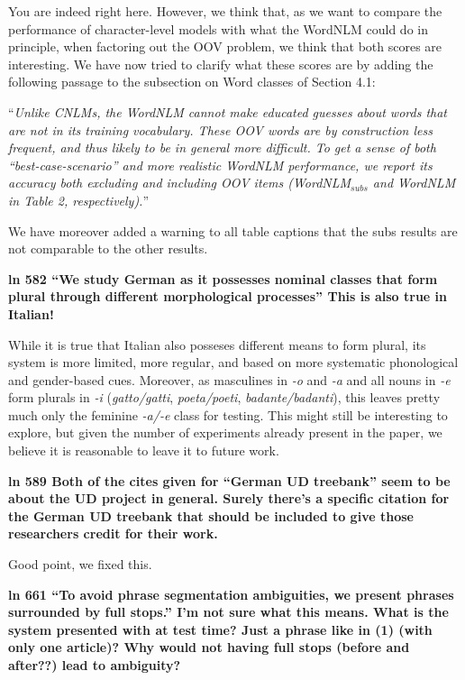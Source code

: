 \documentclass{article}[11pt,a4paper,oneside]
\begin{document}
You are indeed right here. However, we think that, as we want to compare the performance of character-level models with what the WordNLM could do in principle, when factoring out the OOV problem, we think that both scores are interesting. We have now tried to clarify what these scores are by adding the following passage to the subsection on Word classes of Section 4.1:

``\textit{Unlike CNLMs, the WordNLM cannot make educated guesses about words that are not in its training vocabulary. These OOV words are by construction less frequent, and thus likely to be in general more difficult. To get a sense of both ``best-case-scenario'' and more realistic WordNLM performance, we report its accuracy both excluding and including OOV items (WordNLM$_{subs}$ and WordNLM in Table 2, respectively).}''

We have moreover added a warning to all table captions that the subs results are not comparable to the other results.
\newline

\textbf{ln 582 ``We study German as it possesses nominal classes that form plural through different morphological processes'' This is also true in Italian!}

While it is true that Italian also posseses different means to form plural, its system is more limited, more regular, and based on more systematic phonological and gender-based cues. Moreover, as masculines in \textit{-o} and \textit{-a} and all nouns in \textit{-e} form plurals in \textit{-i}  (\textit{gatto/gatti}, \textit{poeta/poeti}, \textit{badante/badanti}), this leaves pretty much only the feminine \textit{-a/-e} class for testing. This might still be interesting to explore, but given the number of experiments already present in the paper, we believe it is reasonable to leave it to future work.
\newline

\textbf{ln 589 Both of the cites given for ``German UD treebank'' seem to be about the UD project in general. Surely there's a specific citation for the German UD treebank that should be included to give those researchers credit for their work.}

Good point, we fixed this.
\newline

\textbf{ln 661 ``To avoid phrase segmentation ambiguities, we present phrases surrounded by full stops.'' I'm not sure what this means. What is the system presented with at test time? Just a phrase like in (1) (with only one article)? Why would not having full stops (before and after??) lead to ambiguity?}
\end{document}
